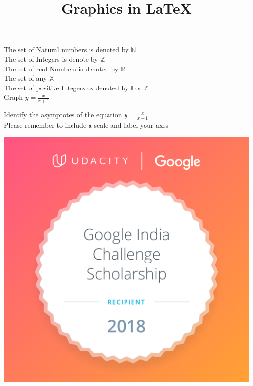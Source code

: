 \documentclass[11pt]{article}
\def\eqn1{y = \frac{x}{x+1}}
\def\labelaxes{remember to include a scale and label your axes}
\begin{document}
The set of Natural numbers is denoted by $\mathbb{N}$\\
The set of Integers is denote by $\mathbb{Z}$\\
The set of real Numbers is denoted by $\mathbb{R}$\\
The set of any $\mathbb{X}$\\
The set of positive Integers os denoted by $\mathbb{I}$ or $\mathbb{Z}^+$\\
Graph $\eqn1$

Identify the asymptotes of the equation $\eqn1$\\
Please \labelaxes\\

\title{Graphics in \LaTeX}
\maketitle

\begin{center}
\includegraphics[scale=0.2, angle=20]{udacity.png}
\end{center}
\end{document}
